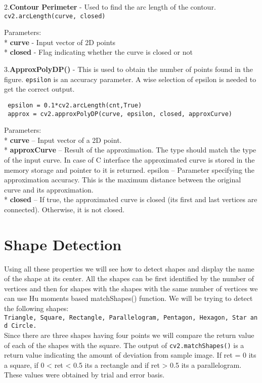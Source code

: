 \documentclass[]{article}
\begin{document}
2.\textbf{Contour Perimeter} - Used to find the arc length of the
contour.\\
\texttt{cv2.arcLength(curve,\ closed)}

Parameters:\\
* \textbf{curve} - Input vector of 2D points\\
* \textbf{closed} - Flag indicating whether the curve is closed or not

3.\textbf{ApproxPolyDP()} - This is used to obtain the number of points
found in the figure. \texttt{epsilon} is an accuracy parameter. A wise
selection of epsilon is needed to get the correct output.

\begin{verbatim}
 epsilon = 0.1*cv2.arcLength(cnt,True)
 approx = cv2.approxPolyDP(curve, epsilon, closed, approxCurve) 
\end{verbatim}

Parameters:\\
* \textbf{curve} -- Input vector of a 2D point.\\
* \textbf{approxCurve} -- Result of the approximation. The type should
match the type of the input curve. In case of C interface the
approximated curve is stored in the memory storage and pointer to it is
returned. epsilon -- Parameter specifying the approximation accuracy.
This is the maximum distance between the original curve and its
approximation.\\
* \textbf{closed} -- If true, the approximated curve is closed (its
first and last vertices are connected). Otherwise, it is not closed.

\section{Shape Detection}\label{shape-detection}

Using all these properties we will see how to detect shapes and display
the name of the shape at its center. All the shapes can be first
identified by the number of vertices and then for shapes with the shapes
with the same number of vertices we can use Hu moments based
matchShapes() function. We will be trying to detect the following
shapes:\\
\texttt{Triangle,\ Square,\ Rectangle,\ Parallelogram,\ Pentagon,\ Hexagon,\ Star\ and\ Circle.}\\
Since there are three shapes having four points we will compare the
return value of each of the shapes with the square. The output of
\texttt{cv2.matchShapes()} is a return value indicating the amount of
deviation from sample image. If ret = 0 its a square, if 0 \textless{}
ret \textless{} 0.5 its a rectangle and if ret \textgreater{} 0.5 its a
parallelogram. These values were obtained by trial and error basis.
\end{document}
